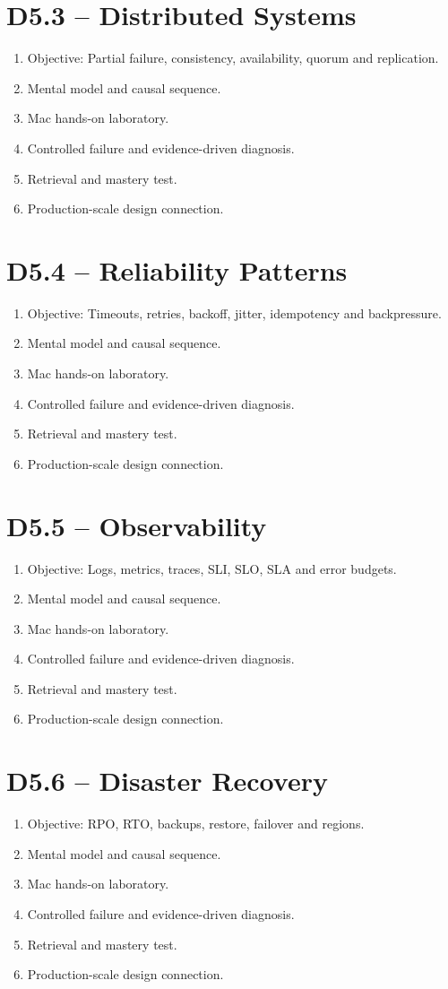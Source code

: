\documentclass[11pt,a4paper]{book}
\begin{document}
\section{D5.3 -- Distributed Systems}
\begin{enumerate}
\item Objective: Partial failure, consistency, availability, quorum and replication.
\item Mental model and causal sequence.
\item Mac hands-on laboratory.
\item Controlled failure and evidence-driven diagnosis.
\item Retrieval and mastery test.
\item Production-scale design connection.
\end{enumerate}
\section{D5.4 -- Reliability Patterns}
\begin{enumerate}
\item Objective: Timeouts, retries, backoff, jitter, idempotency and backpressure.
\item Mental model and causal sequence.
\item Mac hands-on laboratory.
\item Controlled failure and evidence-driven diagnosis.
\item Retrieval and mastery test.
\item Production-scale design connection.
\end{enumerate}
\section{D5.5 -- Observability}
\begin{enumerate}
\item Objective: Logs, metrics, traces, SLI, SLO, SLA and error budgets.
\item Mental model and causal sequence.
\item Mac hands-on laboratory.
\item Controlled failure and evidence-driven diagnosis.
\item Retrieval and mastery test.
\item Production-scale design connection.
\end{enumerate}
\section{D5.6 -- Disaster Recovery}
\begin{enumerate}
\item Objective: RPO, RTO, backups, restore, failover and regions.
\item Mental model and causal sequence.
\item Mac hands-on laboratory.
\item Controlled failure and evidence-driven diagnosis.
\item Retrieval and mastery test.
\item Production-scale design connection.
\end{enumerate}
\end{document}
